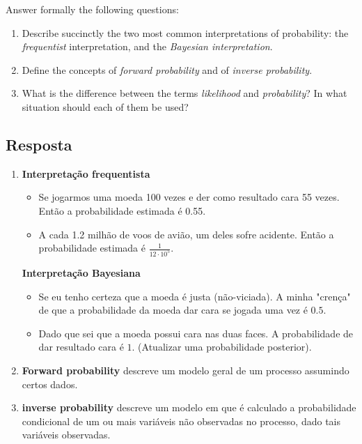 \item Answer formally the following questions:
\begin{enumerate}
  \item Describe succinctly the two most common interpretations of probability: the \textit{frequentist} interpretation, and the \textit{Bayesian interpretation}.
  \item Define the concepts of \textit{forward probability} and of \textit{inverse probability}.
  \item What is the difference between the terms \textit{likelihood} and \textit{probability}? In what situation should each of them be used?
\end{enumerate}

\subsection*{Resposta}

\begin{enumerate}
  \item
  \textbf{Interpretação frequentista}
  \begin{itemize}
    \item Se jogarmos uma moeda 100 vezes e der como resultado cara 55 vezes.
    Então a probabilidade estimada é 0.55.
    \item A cada 1.2 milhão de voos de avião, um deles sofre acidente.
    Então a probabilidade estimada é $\frac{1}{12 \cdot 10^5}$.
  \end{itemize}

  \textbf{Interpretação Bayesiana}

  \begin{itemize}
    \item Se eu tenho certeza que a moeda é justa (não-viciada). A minha "crença"
    de que a probabilidade da moeda dar cara se jogada uma vez é $0.5$.

    \item Dado que sei que a moeda possui cara nas duas faces. A probabilidade de
    dar resultado cara é $1$. (Atualizar uma probabilidade posterior).
  \end{itemize}

  \item
  \textbf{Forward probability} descreve um modelo geral de um processo assumindo
  certos dados.

  \item
  \textbf{inverse probability} descreve um modelo em que é calculado a
  probabilidade   condicional de um ou mais variáveis não observadas no
  processo, dado tais variáveis observadas.

\end{enumerate}
